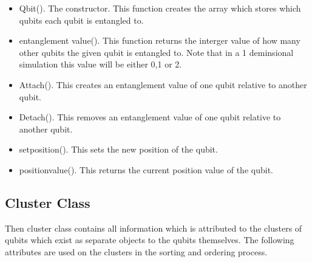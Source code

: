 \documentclass{article}
\numberwithin{equation}{section} %
\begin{document}
\begin{itemize}

\item Qbit(). The constructor. This function creates the array which stores which qubits each qubit is entangled to.

\item entanglement \textunderscore value(). This function returns the interger value of how many other qubits the given qubit is entangled to. Note that in a 1 deminsional simulation this value will be either 0,1 or 2. 

\item Attach().  This creates an entanglement value of one qubit relative to another qubit.
\item Detach(). This removes an entanglement value of one qubit relative to another qubit.
\item set\textunderscore position(). This sets the new position of the qubit. 
\item position\textunderscore value(). This returns the current position value of the qubit.

\end{itemize}



\subsection{Cluster Class}
Then cluster class contains all information which is attributed to the clusters of qubits which exist as separate objects to the qubits themselves. The following attributes are used on the clusters in the sorting and ordering process. 
\end{document}
